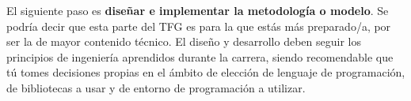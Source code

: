 El siguiente paso es \textbf{diseñar e implementar la metodología o modelo}. Se podría decir que esta parte del TFG es para la que estás más preparado/a, por ser la de mayor contenido técnico. El diseño y desarrollo deben seguir los principios de ingeniería aprendidos durante la carrera, siendo recomendable que tú tomes decisiones propias en el ámbito de elección de lenguaje de programación, de bibliotecas a usar y de entorno de programación a utilizar.

